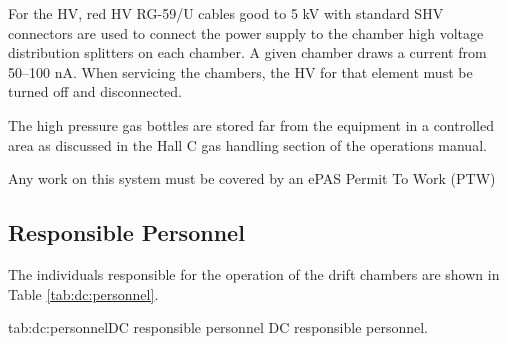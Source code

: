 {For the HV, red HV RG-59/U cables good to 5 kV with standard SHV
connectors are used to connect the power supply to the chamber
high voltage distribution splitters on each chamber.
A given chamber draws a current
from  50--100 nA.  When servicing the chambers, the HV for that
element must be turned off and disconnected.

The high pressure gas bottles are stored far from the equipment in
a controlled
area as discussed in the Hall C gas handling section of the
operations manual.

Any work on this system must be covered by an ePAS Permit To Work (PTW)

\subsection{Responsible Personnel}

The individuals responsible for the operation
of the drift chambers are shown in Table \ref{tab:dc:personnel}.

\begin{namestab}{tab:dc:personnel}{DC responsible personnel}{%
      DC responsible personnel.}
  \LiguangTang{}
  \WilliamHenry{}
\end{namestab}

}


